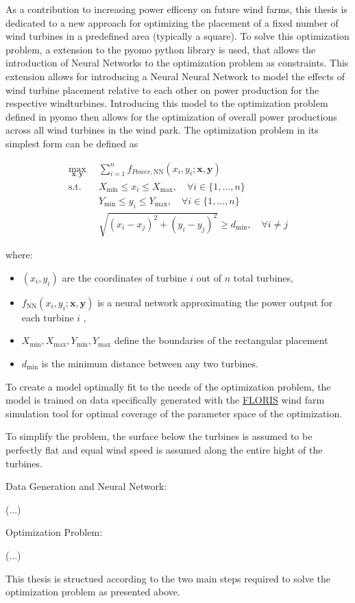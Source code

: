 As a contribution to increasing power efficeny on future wind farms, this thesis is dedicated to a new approach for optimizing the placement of a fixed number of wind turbines in a predefined area (typically a square). To solve this optimization problem, a extension to the pyomo python library is used, that allows the introduction of Neural Networks to the optimization problem as constraints. \cite{ALCANTARA2023120895} This extension allows for introducing a Neural Neural Network to model the effects of wind turbine placement relative to each other on power production for the respective windturbines. Introducing this model to the optimization problem defined in pyomo then allows for the optimization of overall power productions across all wind turbines in the wind park. The optimization problem in its simplest form can be defined as

\begin{align}
	\max_{\mathbf{x}, \mathbf{y}} & \sum_{i=1}^{n} f_{Power,\text{NN}}(x_i, y_i; \mathbf{x}, \mathbf{y}) \\
	\text{s.t.} \quad & X_{\min} \leq x_i \leq X_{\max}, \quad \forall i \in \{1, \dots, n\} \\
	& Y_{\min} \leq y_i \leq Y_{\max}, \quad \forall i \in \{1, \dots, n\} \\
	& \sqrt{(x_i - x_j)^2 + (y_i - y_j)^2} \geq d_{\min}, \quad \forall i \neq j
\end{align}

where:
\begin{itemize}
	\item \( (x_i, y_i) \) are the coordinates of turbine \( i \) out of \(n\) total turbines,
	\item \( f_{\text{NN}}(x_i, y_i; \mathbf{x}, \mathbf{y}) \) is a neural network approximating the power output for each turbine \(i\) ,
	\item \( X_{\min}, X_{\max}, Y_{\min}, Y_{\max} \) define the boundaries of the rectangular placement
	\item \( d_{\min} \) is the minimum distance between any two turbines.
\end{itemize}


To create a model optimally fit to the needs of the optimization problem, the model is trained on data specifically generated with the \href{https://www.nrel.gov/wind/floris.html}{FLORIS} wind farm simulation tool  for optimal coverage of the parameter space of the optimization. 

To simplify the problem, the surface below the turbines is assumed to be perfectly flat and equal wind speed is assumed along the entire hight of the turbines. 

Data Generation and Neural Network: 

(...)

Optimization Problem: 

(...)


This thesis is structued according to the two main steps required to solve the optimization problem as presented above.








